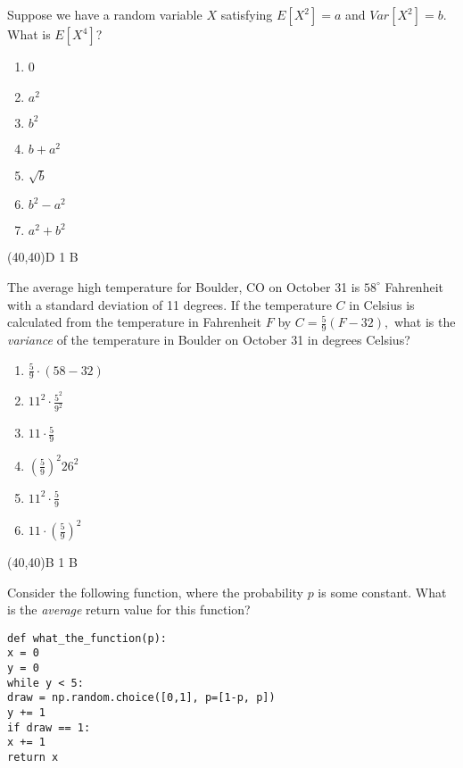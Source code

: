 \documentclass[addpoints]{exam}
\def\solutions{0}
\begin{document}
{\begin{questions}
\clearpage
\question[3] Suppose we have a random variable $X$ satisfying $E[X^2]=a$ and $Var[X^2]=b$.  What is $E[X^4]$?
\begin{minipage}[b]{.85\textwidth}
	\begin{enumerate}[label=\Alph*.]
		\item 0
		\item $a^2$
		\item $b^2$
		\item $b+a^2$
		\item $\sqrt{b}$
		\item $b^2-a^2$
		\item $a^2+b^2$
	\end{enumerate}
\end{minipage}
\begin{minipage}[b]{.1\textwidth}
	\vspace{\fill}\framebox(40,40){D \if\solutions1 B \fi}
\end{minipage}

\question[3] The average high temperature for Boulder, CO on October 31 is $58^\circ$ Fahrenheit with a standard deviation of 11 degrees.  If the temperature $C$ in Celsius is calculated from the temperature in Fahrenheit $F$ by  $C=\frac{5}{9}(F-32),$ what is the \textit{variance} of the temperature in Boulder on October 31 in degrees Celsius?

\begin{minipage}[b]{.85\textwidth}
	\begin{enumerate}[label=\Alph*.]
		\item $\frac{5}{9}\cdot (58-32)$
		\item $11^2 \cdot \frac{5^2}{9^2}$
		\item $11\cdot \frac{5}{9}$
		\item $\left( \frac{5}{9}\right)^2 26^2$
		\item $11^2 \cdot \frac{5}{9}$
		\item $11\cdot \left( \frac{5}{9}\right) ^2$
	\end{enumerate}
\end{minipage}
\begin{minipage}[b]{.1\textwidth}
	\vspace{\fill}\framebox(40,40){B \if\solutions1 B \fi}
\end{minipage}

\question[3] Consider the following function, where the probability $p$ is some constant.  What is the \textit{average} return value for this function?
\begin{lstlisting}
def what_the_function(p):
x = 0
y = 0
while y < 5:
draw = np.random.choice([0,1], p=[1-p, p])
y += 1
if draw == 1:
x += 1
return x
\end{lstlisting}


\end{questions}}
\end{document}
